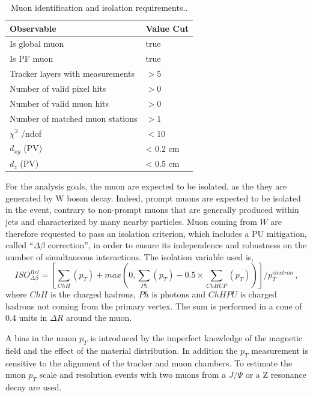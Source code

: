 \begin{table}
\centering
\begin{tabular}{|ll|}
\hline
Observable& Value Cut\\
\hline
Is global muon                        & true              \\ 
Is PF muon                            & true              \\ 
Tracker layers with measurements      & $>5$              \\ 
Number of valid pixel hits            & $>0$              \\ 
Number of valid muon hits             & $>0$              \\ 
Number of matched muon stations       & $>1$              \\ 
$\chi^2$ /ndof                        & $<10$             \\ 
$d_{xy}$ (PV)                         & < 0.2 cm          \\ 
$d_z$ (PV)                            & < 0.5 cm          \\ 
\hline
\end{tabular}
\caption{Muon identification and isolation requirements..}
\label{IDm}
\end{table}
For the analysis goals, the muon are expected to be isolated, as the they are generated by W boson decay. Indeed, prompt muons are expected to be isolated in the event, contrary to non-prompt muons that are generally produced within jets and characterized by many
nearby particles. Muon coming from $W$ are therefore requested to pass an isolation
criterion, which includes a PU mitigation, called ``$\Delta \beta$ correction'',
in order to ensure its independence and robustness on
the number of simultaneous interactions. The isolation variable used is,
\begin{equation} 
ISO^{Rel}_{\Delta \beta}=[\sum_{ChH}(p_T) + max(0, \sum_{Ph}(p_T) -0.5 \times \sum_{ChHUP}(p_T)) ]/p_T^{electron} \, ,
\end{equation}
where $ChH$ is the charged hadrons, $Ph$ is photons and $ChHPU$ is charged
hadrons not coming from the primary vertex.  The sum is performed in a cone of 0.4 units in $\Delta R$ around the muon.

A bias in the muon $p_T$ is introduced by the imperfect knowledge
of the magnetic field and the effect of the material distribution. In addition the $p_T$ measurement is sensitive to the alignment of the tracker and
muon chambers. To estimate the muon $p_T$ scale and resolution 
events with two muons from a $J/\Psi$ or a Z
resonance decay are used. 

